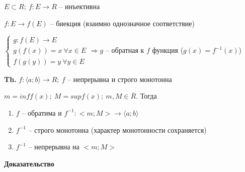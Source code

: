 \documentclass[14pt, letter paper]{article}
\newcommand{\q}[1]{\langle #1 \rangle}
\begin{document}
$E \subset R;\ f : E \rightarrow R$ -- инъективна

$f : E \rightarrow f(E)$ -- биекция (взаимно однозначное соответствие)

$\begin{cases}
    g : f(E) \rightarrow E \\
    g(f(x)) = x\ \forall x \in E \\
    f(g(y)) = y\ \forall y \in E
\end{cases} \Rightarrow g$ -- обратная к $f$ функция ($g(x) = f^{-1}(x)$)

\textbf{Th.} $f : \q{a; b} \rightarrow R;\ f$ -- непрерывна и строго монотонна

$m = inff(x);\ M = supf(x);\ m, M \in \overline{R}$. Тогда

\begin{enumerate}
    \item $f$ -- обратима и $f^{-1} : <m;M> \rightarrow \q{a; b}$
    \item $f^{-1}$ -- строго монотонна (характер монотонности сохраняется)
    \item $f^{-1}$ -- непрерывна на $<m;M>$
\end{enumerate}

\begin{center}
    \textbf{Доказательство}
\end{center}
\end{document}
